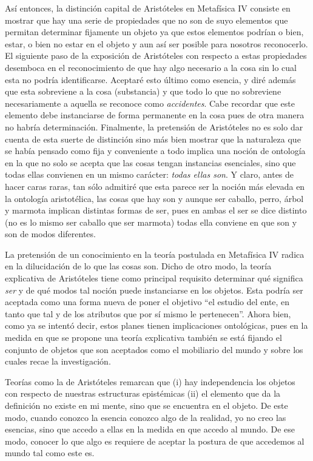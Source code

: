 \documentclass[]{book}
\begin{document}
Así entonces, la distinción capital de Aristóteles en Metafísica IV
consiste en mostrar que hay una serie de propiedades que no son de suyo
elementos que permitan determinar fijamente un objeto ya que estos
elementos podrían o bien, estar, o bien no estar en el objeto y aun así
ser posible para nosotros reconocerlo. El siguiente paso de la
exposición de Aristóteles con respecto a estas propiedades desemboca en
el reconocimiento de que hay algo necesario a la cosa sin lo cual esta
no podría identificarse. Aceptaré esto último como esencia, y diré
además que esta sobreviene a la cosa (substancia) y que todo lo que no
sobreviene necesariamente a aquella se reconoce como \emph{accidentes}.
Cabe recordar que este elemento debe instanciarse de forma permanente en
la cosa pues de otra manera no habría determinación. Finalmente, la
pretensión de Aristóteles no es solo dar cuenta de esta suerte de
distinción sino más bien mostrar que la naturaleza que se había pensado
como fija y conveniente a todo implica una noción de ontología en la que
no solo se acepta que las cosas tengan instancias esenciales, sino que
todas ellas convienen en un mismo carácter: \emph{todas ellas son}. Y
claro, antes de hacer caras raras, tan sólo admitiré que esta parece ser
la noción más elevada en la ontología aristotélica, las cosas que hay
son y aunque ser caballo, perro, árbol y marmota implican distintas
formas de ser, pues en ambas el ser se dice distinto (no es lo mismo ser
caballo que ser marmota) todas ella conviene en que son y son de modos
diferentes.

La pretensión de un conocimiento en la teoría postulada en Metafísica IV
radica en la dilucidación de lo que las cosas son. Dicho de otro modo,
la teoría explicativa de Aristóteles tiene como principal requisito
determinar qué significa \emph{ser} y de qué modos tal noción puede
instanciarse en los objetos. Esta podría ser aceptada como una forma
nueva de poner el objetivo ``el estudio del ente, en tanto que tal y de
los atributos que por sí mismo le pertenecen''. Ahora bien, como ya se
intentó decir, estos planes tienen implicaciones ontológicas, pues en la
medida en que se propone una teoría explicativa también se está fijando
el conjunto de objetos que son aceptados como el mobiliario del mundo y
sobre los cuales recae la investigación.

Teorías como la de Aristóteles remarcan que (i) hay independencia los
objetos con respecto de nuestras estructuras epistémicas (ii) el
elemento que da la definición no existe en mi mente, sino que se
encuentra en el objeto. De este modo, cuando conozco la esencia conozco
algo de la realidad, yo no creo las esencias, sino que accedo a ellas en
la medida en que accedo al mundo. De ese modo, conocer lo que algo es
requiere de aceptar la postura de que accedemos al mundo tal como este
es.
\end{document}
